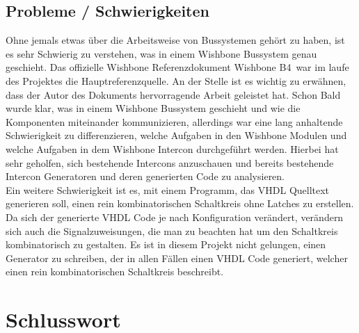 \documentclass{article}
\begin{document}
\subsection{Probleme / Schwierigkeiten}
Ohne jemals etwas über die Arbeitsweise von Bussystemen gehört zu haben, ist es sehr Schwierig zu verstehen, was in einem Wishbone Bussystem genau geschieht. Das offizielle Wishbone Referenzdokument \glqq Wishbone B4\grqq\ war im laufe des Projektes die Hauptreferenzquelle. An der Stelle ist es wichtig zu erwähnen, dass der Autor des Dokuments hervorragende Arbeit geleistet hat. Schon Bald wurde klar, was in einem Wishbone Bussystem geschieht und wie die Komponenten miteinander kommunizieren, allerdings war eine lang anhaltende Schwierigkeit zu differenzieren, welche Aufgaben in den Wishbone Modulen und welche Aufgaben in dem Wishbone Intercon durchgeführt werden. Hierbei hat sehr geholfen, sich bestehende Intercons anzuschauen und bereits bestehende Intercon Generatoren und deren generierten Code zu analysieren. \\
Ein weitere Schwierigkeit ist es, mit einem Programm, das VHDL Quelltext generieren soll, einen rein kombinatorischen Schaltkreis ohne Latches zu erstellen. Da sich der generierte VHDL Code je nach Konfiguration verändert, verändern sich auch die Signalzuweisungen, die man zu beachten hat um den Schaltkreis kombinatorisch zu gestalten. Es ist in diesem Projekt nicht gelungen, einen Generator zu schreiben, der in allen Fällen einen VHDL Code generiert, welcher einen rein kombinatorischen Schaltkreis beschreibt.
\section{Schlusswort}
\end{document}
